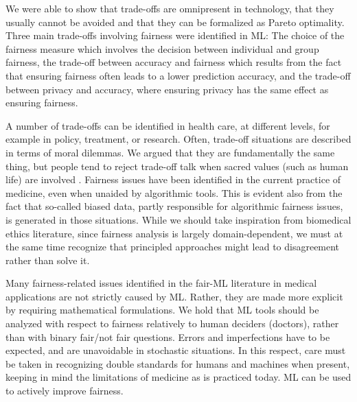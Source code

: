 We were able to show that trade-offs are omnipresent in technology, that they usually cannot be avoided and that they can be formalized as Pareto optimality.
Three main trade-offs involving fairness were identified in ML: The choice of the fairness measure which involves the decision between individual and group fairness, the trade-off between accuracy and fairness which results from the fact that ensuring fairness often leads to a lower prediction accuracy, and the trade-off between privacy and accuracy, where ensuring privacy has the same effect as ensuring fairness.

A number of trade-offs can be identified in health care, at different levels, for example in policy, treatment, or research.
Often, trade-off situations are described in terms of moral dilemmas. We argued that they are fundamentally the same thing, but people tend to reject trade-off talk when sacred values (such as human life) are involved \cite{Tetlock2003}.
Fairness issues have been identified in the current practice of medicine, even when unaided by algorithmic tools. This is evident also from the fact that so-called biased data, partly responsible for algorithmic fairness issues, is generated in those situations.
While we should take inspiration from biomedical ethics literature, since fairness analysis is largely domain-dependent, we must at the same time recognize that principled approaches might lead to disagreement rather than solve it.

Many fairness-related issues identified in the fair-ML literature in medical applications are not strictly caused by ML. Rather, they are made more explicit by requiring mathematical formulations.
We hold that ML tools should be analyzed with respect to fairness relatively to human deciders (doctors), rather than with binary fair/not fair questions. Errors and imperfections have to be expected, and are unavoidable in stochastic situations. In this respect, care must be taken in recognizing double standards for humans and machines when present, keeping in mind the limitations of medicine as is practiced today.
ML can be used to actively improve fairness.
